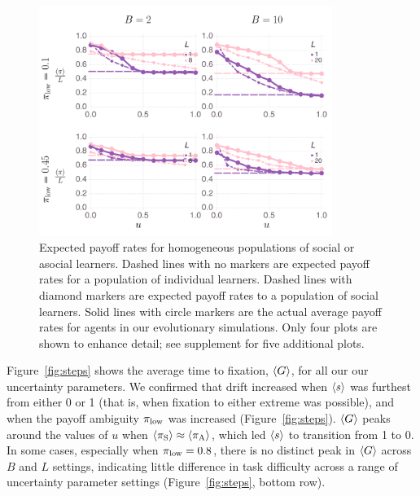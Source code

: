\documentclass[letterpaper,11.5pt]{scrartcl}
\begin{document}
\begin{figure}
  \caption{Expected payoff rates for homogeneous populations of social or asocial learners. Dashed lines with no markers are expected payoff rates for a population of individual learners. Dashed lines with diamond markers are expected payoff rates to a population of social learners. Solid lines with circle markers are the actual average payoff rates for agents in our evolutionary simulations.  
Only four plots are shown to enhance detail; see supplement for
    five additional plots.
} 
  \label{fig:payoffs}
\centering
    \includegraphics[width=0.85\textwidth]{Figures/meanNetPayoffs.pdf}
\end{figure}

Figure~\ref{fig:steps} shows the average time to fixation, $\langle G \rangle$, for all our our uncertainty parameters. We confirmed that drift increased when $\langle s \rangle$ was furthest from either 0 or 1 (that is, when fixation to either extreme was possible), 
and when the payoff ambiguity $\pi_{\mathrm{low}}$ was increased (Figure~\ref{fig:steps}). 
$\langle G \rangle$ peaks around the values of $u$ 
when $\langle \pi_\mathrm{S} \rangle \approx \langle \pi_\mathrm{A} \rangle$, which led $\langle s \rangle$ to transition from 1 to 0.
In some cases, especially when $\pi_{\mathrm{low}}=0.8$,
there is no distinct peak in $\langle G \rangle$ across $B$ and $L$ settings, 
indicating little difference in task difficulty across a range of uncertainty
parameter settings (Figure~\ref{fig:steps}, bottom row).
\end{document}
